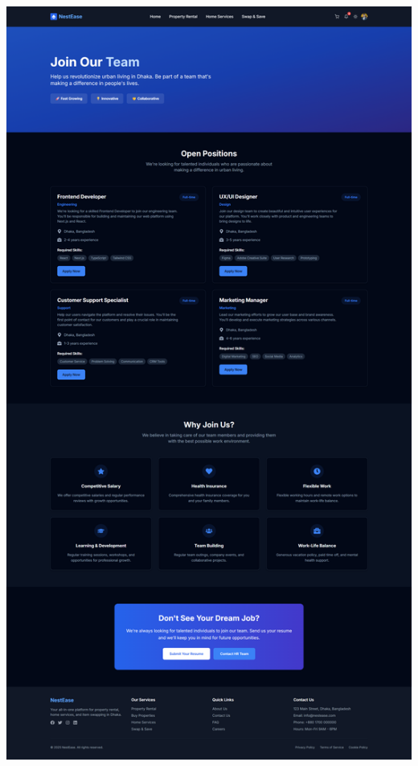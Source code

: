 \documentclass[conference]{IEEEtran}
\begin{document}
\begin{center}
\begin{minipage}[t]{0.45\textwidth}
\includegraphics[width=\linewidth]{Project Screenshot/Career Opportunity.png}
\end{minipage}


\end{center}
\end{document}
